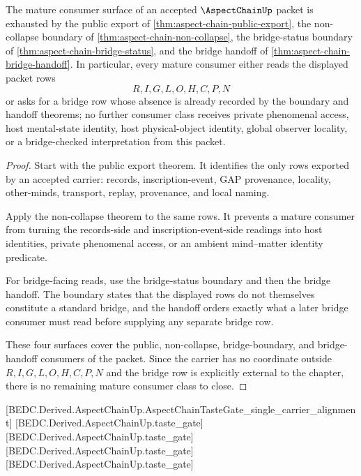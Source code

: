 \begin{theorem}
\label{thm:aspect-chain-mature-consumer-completeness}
The mature consumer surface of an accepted $\AspectChainUp$ packet is exhausted by the public export of \autoref{thm:aspect-chain-public-export}, the non-collapse boundary of \autoref{thm:aspect-chain-non-collapse}, the bridge-status boundary of \autoref{thm:aspect-chain-bridge-status}, and the bridge handoff of \autoref{thm:aspect-chain-bridge-handoff}. In particular, every mature consumer either reads the displayed packet rows
$$
R,I,G,L,O,H,C,P,N
$$
or asks for a bridge row whose absence is already recorded by the boundary and handoff theorems; no further consumer class receives private phenomenal access, host mental-state identity, host physical-object identity, global observer locality, or a bridge-checked interpretation from this packet.
\end{theorem}
\begin{proof}
Start with the public export theorem. It identifies the only rows exported by an accepted carrier: records, inscription-event, GAP provenance, locality, other-minds, transport, replay, provenance, and local naming.

Apply the non-collapse theorem to the same rows. It prevents a mature consumer from turning the records-side and inscription-event-side readings into host identities, private phenomenal access, or an ambient mind--matter identity predicate.

For bridge-facing reads, use the bridge-status boundary and then the bridge handoff. The boundary states that the displayed rows do not themselves constitute a standard bridge, and the handoff orders exactly what a later bridge consumer must read before supplying any separate bridge row.

These four surfaces cover the public, non-collapse, bridge-boundary, and bridge-handoff consumers of the packet. Since the carrier has no coordinate outside $R,I,G,L,O,H,C,P,N$ and the bridge row is explicitly external to the chapter, there is no remaining mature consumer class to close.
\end{proof}

[BEDC.Derived.AspectChainUp.AspectChainTasteGate\_single\_carrier\_alignment]
[BEDC.Derived.AspectChainUp.taste\_gate]
[BEDC.Derived.AspectChainUp.taste\_gate]
[BEDC.Derived.AspectChainUp.taste\_gate]
[BEDC.Derived.AspectChainUp.taste\_gate]

